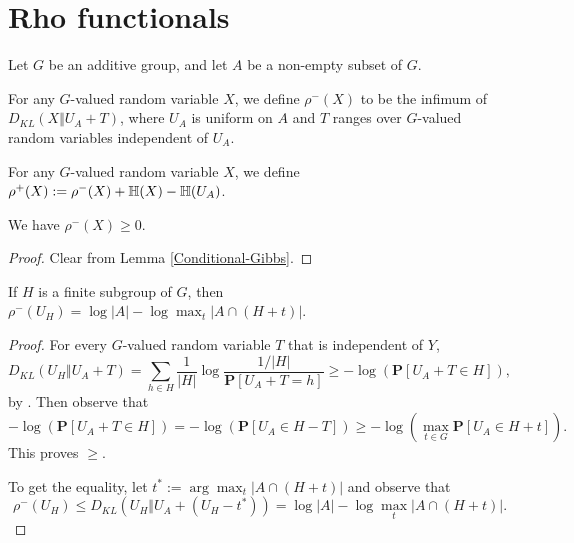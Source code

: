 \section{Rho functionals}

Let $G$ be an additive group, and let $A$ be a non-empty subset of $G$.

\begin{definition}\label{rhominus-def}\leanok  For any $G$-valued random variable $X$, we define $\rho^-(X)$ to be the infimum of $D_{KL}(X \Vert  U_A + T)$, where $U_A$ is uniform on $A$ and $T$ ranges over $G$-valued random variables independent of $U_A$.
\end{definition}

\begin{definition}\label{rhoplus-def}\leanok  For any $G$-valued random variable $X$, we define $\rho^+(X) := \rho^-(X) + \mathbb{H}(X) - \mathbb{H}(U_A)$.
\end{definition}

\begin{lemma}\label{rhominus-nonneg}\label{rho_minus_nonneg}\leanok  We have $\rho^-(X) \geq 0$.
\end{lemma}

\begin{proof} Clear from Lemma \ref{Conditional-Gibbs}.
\end{proof}

\begin{lemma}\label{rhominus-subgroup}\leanok If $H$ is a finite subgroup of $G$, then $\rho^-(U_H) = \log |A| - \log \max_t |A \cap (H+t)|$.
\end{lemma}

\begin{proof}
  For every $G$-valued random variable $T$ that is independent of $Y$,
  $$D_{KL}(U_H \Vert U_A+T) = \sum_{h\in H} \frac{1}{|H|}\log\frac{1/|H|}{\mathbf{P}[U_A+T=h]}\ge -\log(\mathbf{P}[U_A+T\in H]),$$
  by . Then observe that $$-\log(\mathbf{P}[U_A+T\in H])=-\log(\mathbf{P}[U_A\in H-T])\ge -\log(\max_{t\in G} \mathbf{P}[U_A\in H+t]).$$ This proves $\ge$.

  To get the equality, let $t^*:=\arg\max_t |A \cap (H+t)|$ and observe that $$\rho^-(U_H)\le D_{KL}(U_H \Vert  U_A+(U_H-t^*))= \log |A| - \log \max_t|A \cap (H+t)|.$$
\end{proof}

